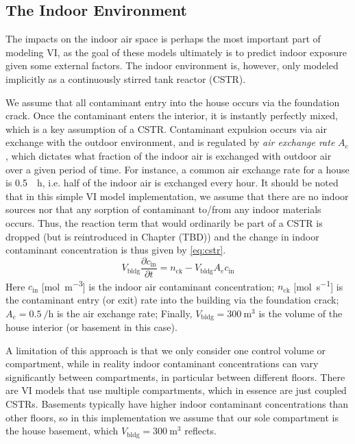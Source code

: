 
\subsection{The Indoor Environment}\label{sec:indoor}

The impacts on the indoor air space is perhaps the most important part of modeling VI, as the goal of these models ultimately is to predict indoor exposure given some external factors.
The indoor environment is, however, only modeled implicitly as a continuously stirred tank reactor (CSTR).\par
We assume that all contaminant entry into the house occurs via the foundation crack.
Once the contaminant enters the interior, it is instantly perfectly mixed, which is a key assumption of a CSTR.
Contaminant expulsion occurs via air exchange with the outdoor environment, and is regulated by \textit{air exchange rate} $A_e$, which dictates what fraction of the indoor air is exchanged with outdoor air over a given period of time.
For instance, a common air exchange rate for a house is \SI{0.5}{\per\hour}, i.e. half of the indoor air is exchanged every hour.
It should be noted that in this simple VI model implementation, we assume that there are no indoor sources nor that any sorption of contaminant to/from any indoor materials occurs.
Thus, the reaction term that would ordinarily be part of a CSTR is dropped (but is reintroduced in Chapter (TBD)) and the change in indoor contaminant concentration is thus given by \eqref{eq:cstr}. %
\begin{equation}\label{eq:cstr}
  V_\mathrm{bldg}\frac{\partial c_\mathrm{in}}{\partial t} = n_\mathrm{ck} - V_\mathrm{bldg} A_e c_\mathrm{in}
\end{equation}
Here $c_\mathrm{in}$ [\si{\mol\per\metre\cubed}] is the indoor air contaminant concentration;
$n_\mathrm{ck}$ [\si{\mol\per\second}] is the contaminant entry (or exit) rate into the building via the foundation crack;
$A_e = \SI{0.5}{\per\hour}$ is the air exchange rate;
Finally, $V_\mathrm{bldg} = \SI{300}{\metre\cubed}$ is the volume of the house interior (or basement in this case).\par

A limitation of this approach is that we only consider one control volume or compartment, while in reality indoor contaminant concentrations can vary significantly between compartments, in particular between different floors.
There are VI models that use multiple compartments, which in essence are just coupled CSTRs\cite{murphy_multi-compartment_2011}.
Basements typically have higher indoor contaminant concentrations than other floors, so in this implementation we assume that our sole compartment is the house basement, which $V_\mathrm{bldg} = \SI{300}{\metre\cubed}$ reflects.\par

